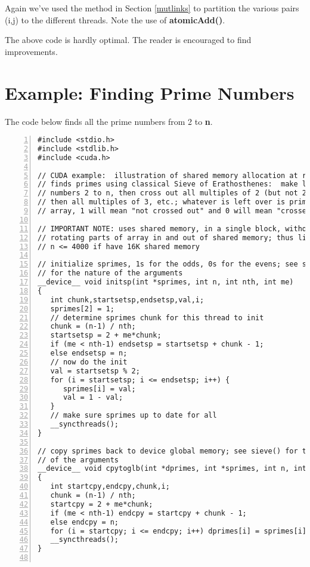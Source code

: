 Again we've used the method in Section \ref{mutlinks} to partition the
various pairs (i,j) to the different threads.  Note the use of {\bf
atomicAdd()}.

The above code is hardly optimal.  The reader is encouraged to find
improvements.

\section{Example:  Finding Prime Numbers}
\label{primefinder}

The code below finds all the prime numbers from 2 to {\bf n}.

\begin{lstlisting}[numbers=left]
#include <stdio.h>
#include <stdlib.h>
#include <cuda.h>

// CUDA example:  illustration of shared memory allocation at run time;
// finds primes using classical Sieve of Erathosthenes:  make list of
// numbers 2 to n, then cross out all multiples of 2 (but not 2 itself),
// then all multiples of 3, etc.; whatever is left over is prime; in our
// array, 1 will mean "not crossed out" and 0 will mean "crossed out"

// IMPORTANT NOTE: uses shared memory, in a single block, without
// rotating parts of array in and out of shared memory; thus limited to
// n <= 4000 if have 16K shared memory

// initialize sprimes, 1s for the odds, 0s for the evens; see sieve()
// for the nature of the arguments
__device__ void initsp(int *sprimes, int n, int nth, int me) 
{
   int chunk,startsetsp,endsetsp,val,i;
   sprimes[2] = 1;
   // determine sprimes chunk for this thread to init
   chunk = (n-1) / nth;
   startsetsp = 2 + me*chunk;
   if (me < nth-1) endsetsp = startsetsp + chunk - 1;
   else endsetsp = n;
   // now do the init
   val = startsetsp % 2; 
   for (i = startsetsp; i <= endsetsp; i++) {
      sprimes[i] = val;
      val = 1 - val;
   }
   // make sure sprimes up to date for all
   __syncthreads();
}

// copy sprimes back to device global memory; see sieve() for the nature
// of the arguments
__device__ void cpytoglb(int *dprimes, int *sprimes, int n, int nth, int me) 
{
   int startcpy,endcpy,chunk,i;
   chunk = (n-1) / nth;
   startcpy = 2 + me*chunk;
   if (me < nth-1) endcpy = startcpy + chunk - 1;
   else endcpy = n;
   for (i = startcpy; i <= endcpy; i++) dprimes[i] = sprimes[i];
   __syncthreads();
}


\end{lstlisting}
